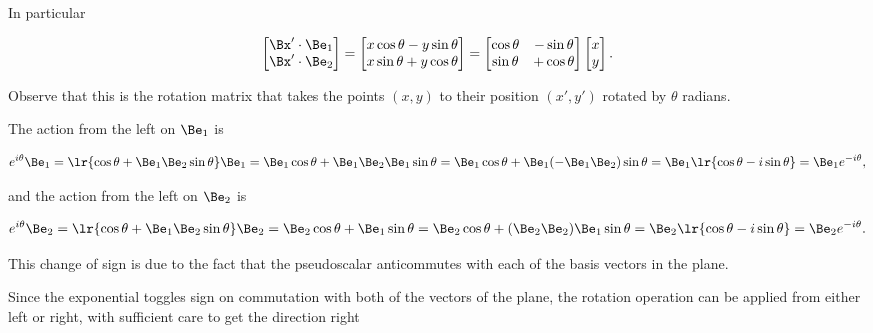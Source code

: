 {In particular

\begin{dmath}\label{eqn:gradeselectionProblems:380}
\begin{bmatrix}
\Bx' \cdot \Be_1 \\
\Bx' \cdot \Be_2 \\
\end{bmatrix}
=
\begin{bmatrix}
x \cos\theta - y \sin\theta \\
x \sin\theta + y \cos\theta
\end{bmatrix}
=
\begin{bmatrix}
\cos\theta &- \sin\theta \\
\sin\theta &+ \cos\theta
\end{bmatrix}
\begin{bmatrix}
x \\
y
\end{bmatrix}.
\end{dmath}

Observe that this is the rotation matrix that takes the points \((x, y)\) to their position \((x', y')\) rotated by \( \theta \) radians.

The action from the left on \( \Be_1 \) is

\begin{dmath}\label{eqn:gradeselectionProblems:400}
e^{i\theta} \Be_1
=
\lr{ \cos\theta + \Be_1 \Be_2 \sin\theta} \Be_1
=
\Be_1 \cos\theta + \Be_1 \Be_2 \Be_1 \sin\theta
=
\Be_1 \cos\theta + \Be_1 (-\Be_1 \Be_2) \sin\theta
=
\Be_1 \lr{ \cos\theta - i \sin\theta }
=
\Be_1 e^{-i\theta},
\end{dmath}

and the action from the left on \( \Be_2 \) is

\begin{dmath}\label{eqn:gradeselectionProblems:420}
e^{i\theta} \Be_2
=
\lr{ \cos\theta + \Be_1 \Be_2 \sin\theta} \Be_2
=
\Be_2 \cos\theta + \Be_1 \sin\theta
=
\Be_2 \cos\theta + (\Be_2 \Be_2) \Be_1 \sin\theta
=
\Be_2 \lr{ \cos\theta - i \sin\theta }
=
\Be_2 e^{-i\theta}.
\end{dmath}

This change of sign is due to the fact that the pseudoscalar anticommutes with each of the basis vectors in the plane.


Since the exponential toggles sign on commutation with both of the vectors of the plane, the rotation operation can be applied from either left or right, with sufficient care to get the direction right

}

